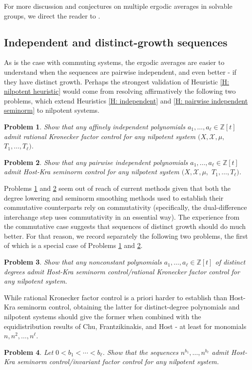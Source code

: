 \documentclass[11pt]{amsart}
\newtheorem{problem}{Problem}
\theoremstyle{definition}
\newcommand{\Z}{{\mathbb Z}}
\newcommand{\CX}{{\mathcal X}}
\newcommand{\1}{{\mathbf{1}}}
\begin{document}
For more discussion and conjectures on multiple ergodic averages in solvable groups, we direct the reader to \cite[Section 5]{BL02}.



\subsection{Independent and distinct-growth sequences}
As is the case with commuting systems, the ergodic averages are easier to understand when the sequences are pairwise independent, and even better - if they have distinct growth. Perhaps the strongest validation of Heuristic \ref{H: nilpotent heuristic} would come from resolving affirmatively the following two problems, which extend Heuristics \ref{H: independent} and \ref{H: pairwise independent seminorm} to nilpotent systems.
\begin{problem}\label{Pr: affinely independent nilpotent}
    Show that any affinely independent polynomials $a_1, \ldots, a_\ell\in\Z[t]$ admit rational Kronecker factor control for any nilpotent system $(X, \CX, \mu,$\! $T_1, \ldots, T_\ell)$.
\end{problem}
\begin{problem}\label{Pr: pairwise independent nilpotent}
    Show that any pairwise independent polynomials $a_1, \ldots, a_\ell\in\Z[t]$ admit Host-Kra seminorm control for any nilpotent system $(X, \CX, \mu,$\! $T_1, \ldots, T_\ell)$.
\end{problem}

Problems \ref{Pr: affinely independent nilpotent} and \ref{Pr: pairwise independent nilpotent} seem out of reach of current methods given that both the degree lowering and seminorm smoothing methods used to establish their commutative counterparts rely on commutativity (specifically, the dual-difference interchange step uses commutativity in an essential way). The experience from the commutative case suggests that sequences of distinct growth should do much better. For that reason, we record separately the following two problems, the first of which is a special case of Problems \ref{Pr: affinely independent nilpotent} and \ref{Pr: pairwise independent nilpotent}.
\begin{problem}\label{Pr: distinct degree nilpotent}
    Show that any nonconstant polynomials $a_1, \ldots, a_\ell\in\Z[t]$ of distinct degrees admit Host-Kra seminorm control/rational Kronecker factor control for any nilpotent system. %
\end{problem}
While rational Kronecker factor control is a priori harder to establish than Host-Kra seminorm control, obtaining the latter for distinct-degree polynomials and nilpotent systems should give the former when combined with the equidistribution results of Chu, Frantzikinakis, and Host \cite[Section 7.4]{CFH11} - at least for monomials $n, n^2, \ldots, n^\ell$.
\begin{problem}\label{Pr: distinct powers nilpotent}
    Let $0<b_1< \cdots < b_\ell$. Show that the sequences $n^{b_1}, \ldots, n^{b_\ell}$ admit Host-Kra seminorm control/invariant factor control for any nilpotent system. %
\end{problem}
\end{document}
